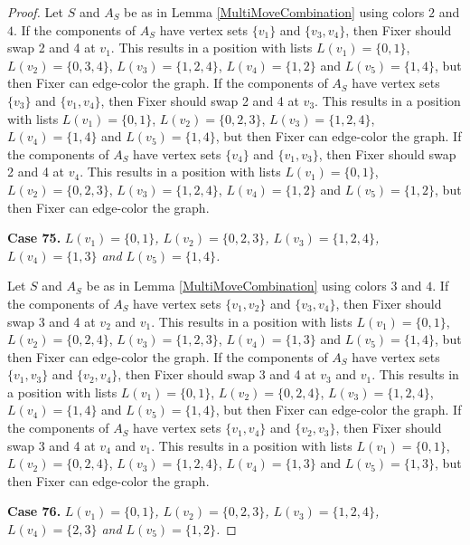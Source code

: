 \documentclass[12pt]{amsart}
\theoremstyle{plain}
\theoremstyle{definition}
\theoremstyle{remark}
\begin{document}
\begin{proof}
Let $S$ and $A_S$ be as in Lemma \ref{MultiMoveCombination} using colors $2$ and $4$. If the components of $A_S$ have vertex sets $\{v_1\}$ and $\{v_3, v_4\}$, then Fixer should swap 2 and 4 at $v_1$. This results in a position with lists $L(v_1) = \{0, 1\}$, $L(v_2) = \{0, 3, 4\}$, $L(v_3) = \{1, 2, 4\}$, $L(v_4) = \{1, 2\}$ and $L(v_5) = \{1, 4\}$, but then Fixer can edge-color the graph.
If the components of $A_S$ have vertex sets $\{v_3\}$ and $\{v_1, v_4\}$, then Fixer should swap 2 and 4 at $v_3$. This results in a position with lists $L(v_1) = \{0, 1\}$, $L(v_2) = \{0, 2, 3\}$, $L(v_3) = \{1, 2, 4\}$, $L(v_4) = \{1, 4\}$ and $L(v_5) = \{1, 4\}$, but then Fixer can edge-color the graph.
If the components of $A_S$ have vertex sets $\{v_4\}$ and $\{v_1, v_3\}$, then Fixer should swap 2 and 4 at $v_4$. This results in a position with lists $L(v_1) = \{0, 1\}$, $L(v_2) = \{0, 2, 3\}$, $L(v_3) = \{1, 2, 4\}$, $L(v_4) = \{1, 2\}$ and $L(v_5) = \{1, 2\}$, but then Fixer can edge-color the graph.

\noindent\textbf{Case 75.  }\textit{$L(v_1) = \{0, 1\}$, $L(v_2) = \{0, 2, 3\}$, $L(v_3) = \{1, 2, 4\}$, $L(v_4) = \{1, 3\}$ and $L(v_5) = \{1, 4\}$.}

Let $S$ and $A_S$ be as in Lemma \ref{MultiMoveCombination} using colors $3$ and $4$. If the components of $A_S$ have vertex sets $\{v_1, v_2\}$ and $\{v_3, v_4\}$, then Fixer should swap 3 and 4 at $v_2$ and $v_1$. This results in a position with lists $L(v_1) = \{0, 1\}$, $L(v_2) = \{0, 2, 4\}$, $L(v_3) = \{1, 2, 3\}$, $L(v_4) = \{1, 3\}$ and $L(v_5) = \{1, 4\}$, but then Fixer can edge-color the graph.
If the components of $A_S$ have vertex sets $\{v_1, v_3\}$ and $\{v_2, v_4\}$, then Fixer should swap 3 and 4 at $v_3$ and $v_1$. This results in a position with lists $L(v_1) = \{0, 1\}$, $L(v_2) = \{0, 2, 4\}$, $L(v_3) = \{1, 2, 4\}$, $L(v_4) = \{1, 4\}$ and $L(v_5) = \{1, 4\}$, but then Fixer can edge-color the graph.
If the components of $A_S$ have vertex sets $\{v_1, v_4\}$ and $\{v_2, v_3\}$, then Fixer should swap 3 and 4 at $v_4$ and $v_1$. This results in a position with lists $L(v_1) = \{0, 1\}$, $L(v_2) = \{0, 2, 4\}$, $L(v_3) = \{1, 2, 4\}$, $L(v_4) = \{1, 3\}$ and $L(v_5) = \{1, 3\}$, but then Fixer can edge-color the graph.

\noindent\textbf{Case 76.  }\textit{$L(v_1) = \{0, 1\}$, $L(v_2) = \{0, 2, 3\}$, $L(v_3) = \{1, 2, 4\}$, $L(v_4) = \{2, 3\}$ and $L(v_5) = \{1, 2\}$.}


\end{proof}
\end{document}
